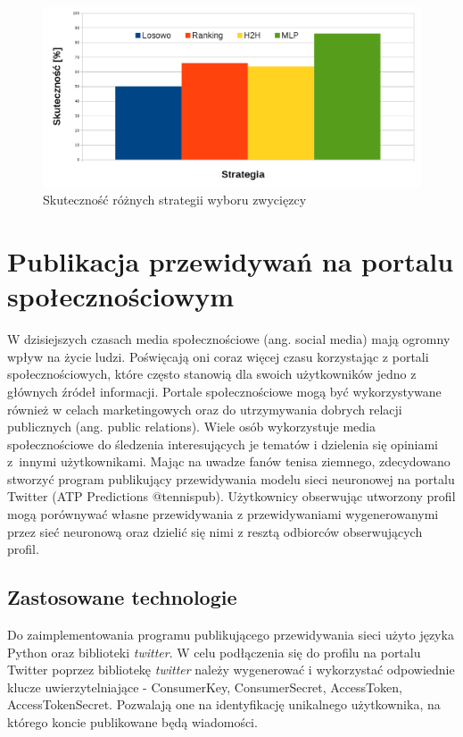 \begin{figure}[H]
\includegraphics[width=\textwidth]{scores.png}
\caption{Skuteczność różnych strategii wyboru zwycięzcy}
\label{fig:scores}
\end{figure}



\chapter{Publikacja przewidywań na portalu społecznościowym}

W dzisiejszych czasach media społecznościowe (ang. social media) mają ogromny wpływ na życie ludzi. Poświęcają oni coraz więcej czasu korzystając z portali społecznościowych, które często stanowią dla swoich użytkowników jedno z głównych źródeł informacji. Portale społecznościowe mogą być wykorzystywane również w celach marketingowych oraz do utrzymywania dobrych relacji publicznych (ang. public relations). Wiele osób wykorzystuje media społecznościowe do śledzenia interesujących je tematów i dzielenia się opiniami z~innymi użytkownikami. Mając na uwadze fanów tenisa ziemnego, zdecydowano stworzyć program publikujący przewidywania modelu sieci neuronowej na portalu Twitter (ATP Predictions @tennispub). Użytkownicy obserwując utworzony profil mogą porównywać własne przewidywania z przewidywaniami wygenerowanymi przez sieć neuronową oraz dzielić się nimi z resztą odbiorców obserwujących profil.

\section{Zastosowane technologie}
\label{Sec:BotTech}

Do zaimplementowania programu publikującego przewidywania sieci użyto języka Python oraz biblioteki \textit{twitter}. W celu podłączenia się do profilu na portalu Twitter poprzez bibliotekę \textit{twitter} należy wygenerować i wykorzystać odpowiednie klucze uwierzytelniające - ConsumerKey, ConsumerSecret, AccessToken, AccessTokenSecret. Pozwalają one na identyfikację unikalnego użytkownika, na którego koncie publikowane będą wiadomości.

